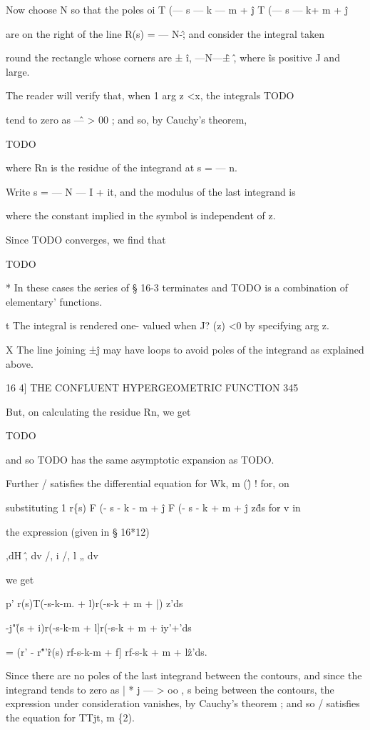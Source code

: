 Now choose N so that the poles oi T (— s — k — m + \^j T (— s — k+ m + \^j 

are on the right of the line R(s) = — N-\^; and consider the integral taken 

round the rectangle whose corners are ± \^i, —N—\^± \^, where \^ is positive J 
and large. 

The reader will verify that, when 1 arg z <x, the integrals 
TODO

tend to zero as \^— > 00 ; and so, by Cauchy's theorem, 

TODO

where Rn is the residue of the integrand at s = — n. 

Write s = — N — I + it, and the modulus of the last integrand is 

where the constant implied in the symbol is independent of z. 

Since TODO converges, we find that 

TODO

* In these cases the series of § 16-3 terminates and TODO is a combination of elementary' 
functions. 

t The integral is rendered one- valued when J? (z) <0 by specifying arg z. 

X The line joining ±\^j may have loops to avoid poles of the integrand as explained above. 



16 4] THE CONFLUENT HYPERGEOMETRIC FUNCTION 345 

But, on calculating the residue Rn, we get 

TODO

and so TODO has the same asymptotic expansion as TODO. 

Further / satisfies the differential equation for Wk, m (\^) ! for, on 

substituting 1 r\{s) F (- s - k - m + \^j F (- s - k + m + \^j z\^ds for v in 

the expression (given in § 16*12) 

,dH \^, dv /, i /, l „ dv 

we get 

p' r(s)T(-s-k-m. + l)r(-s-k + m + |) z'ds 

-j"\r(s + i)r(-s-k-m + l]r(-s-k + m + iy'+'ds 

= (r' - r\^"'\^ r(s) rf-s-k-m + f] rf-s-k + m + l\^z'ds. 

Since there are no poles of the last integrand between the contours, and 
since the integrand tends to zero as | * j — > oo , s being between the contours, 
the expression under consideration vanishes, by Cauchy's theorem ; and so 
/ satisfies the equation for TTjt, m \{2). 

